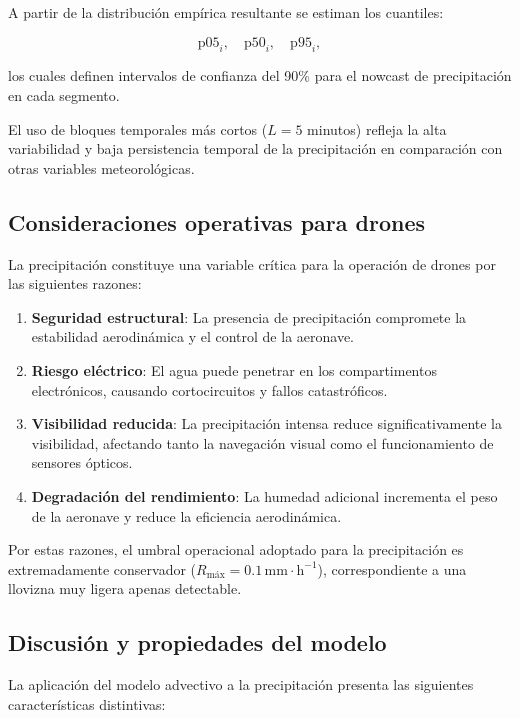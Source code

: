 \documentclass[
  spanish,
  us-letterpaper,
]{scrreprt}
\numberwithin{equation}{section}
\begin{document}
A partir de la distribución empírica resultante se estiman los
cuantiles:

\[
\text{p05}_i, \quad \text{p50}_i, \quad \text{p95}_i,
\]

los cuales definen intervalos de confianza del 90\% para el nowcast de
precipitación en cada segmento.

El uso de bloques temporales más cortos (\(L = 5\) minutos) refleja la
alta variabilidad y baja persistencia temporal de la precipitación en
comparación con otras variables meteorológicas.

\subsection{Consideraciones operativas para
drones}\label{consideraciones-operativas-para-drones}

La precipitación constituye una variable crítica para la operación de
drones por las siguientes razones:

\begin{enumerate}
\def\labelenumi{\arabic{enumi}.}
\item
  \textbf{Seguridad estructural}: La presencia de precipitación
  compromete la estabilidad aerodinámica y el control de la aeronave.
\item
  \textbf{Riesgo eléctrico}: El agua puede penetrar en los
  compartimentos electrónicos, causando cortocircuitos y fallos
  catastróficos.
\item
  \textbf{Visibilidad reducida}: La precipitación intensa reduce
  significativamente la visibilidad, afectando tanto la navegación
  visual como el funcionamiento de sensores ópticos.
\item
  \textbf{Degradación del rendimiento}: La humedad adicional incrementa
  el peso de la aeronave y reduce la eficiencia aerodinámica.
\end{enumerate}

Por estas razones, el umbral operacional adoptado para la precipitación
es extremadamente conservador
(\(R_{\text{máx}} = 0.1 \, \mathrm{mm \cdot h^{-1}}\)), correspondiente
a una llovizna muy ligera apenas detectable.

\subsection{Discusión y propiedades del
modelo}\label{discusiuxf3n-y-propiedades-del-modelo-2}

La aplicación del modelo advectivo a la precipitación presenta las
siguientes características distintivas:
\end{document}

